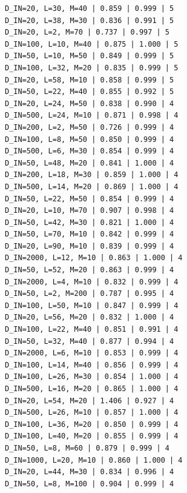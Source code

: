 \documentclass{article}
\begin{document}
\begin{verbatim}
D_IN=20, L=30, M=40 | 0.859 | 0.999 | 5
D_IN=20, L=38, M=30 | 0.836 | 0.991 | 5
D_IN=20, L=2, M=70 | 0.737 | 0.997 | 5
D_IN=100, L=10, M=40 | 0.875 | 1.000 | 5
D_IN=50, L=10, M=50 | 0.849 | 0.999 | 5
D_IN=100, L=32, M=20 | 0.835 | 0.999 | 5
D_IN=20, L=58, M=10 | 0.858 | 0.999 | 5
D_IN=50, L=22, M=40 | 0.855 | 0.992 | 5
D_IN=20, L=24, M=50 | 0.838 | 0.990 | 4
D_IN=500, L=24, M=10 | 0.871 | 0.998 | 4
D_IN=200, L=2, M=50 | 0.726 | 0.999 | 4
D_IN=100, L=8, M=50 | 0.850 | 0.999 | 4
D_IN=500, L=6, M=30 | 0.854 | 0.999 | 4
D_IN=50, L=48, M=20 | 0.841 | 1.000 | 4
D_IN=200, L=18, M=30 | 0.859 | 1.000 | 4
D_IN=500, L=14, M=20 | 0.869 | 1.000 | 4
D_IN=50, L=22, M=50 | 0.854 | 0.999 | 4
D_IN=20, L=10, M=70 | 0.907 | 0.998 | 4
D_IN=50, L=42, M=30 | 0.821 | 1.000 | 4
D_IN=50, L=70, M=10 | 0.842 | 0.999 | 4
D_IN=20, L=90, M=10 | 0.839 | 0.999 | 4
D_IN=2000, L=12, M=10 | 0.863 | 1.000 | 4
D_IN=50, L=52, M=20 | 0.863 | 0.999 | 4
D_IN=2000, L=4, M=10 | 0.832 | 0.999 | 4
D_IN=50, L=2, M=200 | 0.787 | 0.995 | 4
D_IN=100, L=50, M=10 | 0.847 | 0.999 | 4
D_IN=20, L=56, M=20 | 0.832 | 1.000 | 4
D_IN=100, L=22, M=40 | 0.851 | 0.991 | 4
D_IN=50, L=32, M=40 | 0.877 | 0.994 | 4
D_IN=2000, L=6, M=10 | 0.853 | 0.999 | 4
D_IN=100, L=14, M=40 | 0.856 | 0.999 | 4
D_IN=100, L=26, M=30 | 0.854 | 1.000 | 4
D_IN=500, L=16, M=20 | 0.865 | 1.000 | 4
D_IN=20, L=54, M=20 | 1.406 | 0.927 | 4
D_IN=500, L=26, M=10 | 0.857 | 1.000 | 4
D_IN=100, L=36, M=20 | 0.850 | 0.999 | 4
D_IN=100, L=40, M=20 | 0.855 | 0.999 | 4
D_IN=50, L=8, M=60 | 0.879 | 0.999 | 4
D_IN=1000, L=20, M=10 | 0.860 | 1.000 | 4
D_IN=20, L=44, M=30 | 0.834 | 0.996 | 4
D_IN=50, L=8, M=100 | 0.904 | 0.999 | 4
\end{verbatim}

\newpage
\end{document}
